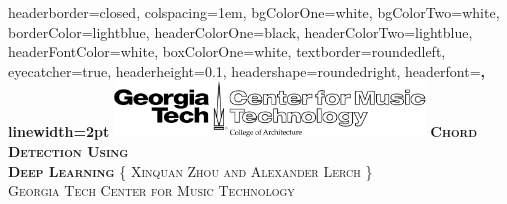 \documentclass[landscape,archE1,fontscale=0.315]{baposter} %
\begin{document}
\begin{poster}
{
headerborder=closed, %
colspacing=1em, %
bgColorOne=white, %
bgColorTwo=white, %
borderColor=lightblue, %
headerColorOne=black, %
headerColorTwo=lightblue, %
headerFontColor=white, %
boxColorOne=white, %
textborder=roundedleft, %
eyecatcher=true, %
headerheight=0.1\textheight, %
headershape=roundedright, %
headerfont=\Large\bf\textsc, %
linewidth=2pt %
}
%
{\includegraphics[height=4em]{gtcmt}} %
{\bf\textsc{Chord Detection Using \\ Deep Learning}\vspace{0.5em}} %
{\textsc{\{ Xinquan Zhou and Alexander Lerch \} \hspace{12pt} \\ Georgia Tech Center for Music Technology}} %



\end{poster}
\end{document}
